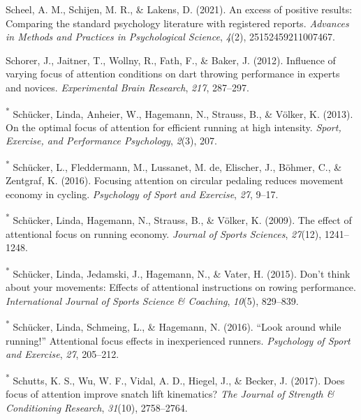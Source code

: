 \documentclass[
  man, donotrepeattitle,floatsintext]{apa7}
\newlength{\cslhangindent}
\newlength{\cslentryspacingunit} %
\newenvironment{CSLReferences}[2] %
 {%
  \setlength{\parindent}{0pt}
  \ifodd #1
  \let\oldpar\par
  \def\par{\hangindent=\cslhangindent\oldpar}
  \fi
  \setlength{\parskip}{#2\cslentryspacingunit}
 }%
 {}
\begin{document}
\begin{CSLReferences}{1}{0}
\leavevmode{}%
Scheel, A. M., Schijen, M. R., \& Lakens, D. (2021). An excess of positive results: Comparing the standard psychology literature with registered reports. \emph{Advances in Methods and Practices in Psychological Science}, \emph{4}(2), 25152459211007467.

\leavevmode{}%
Schorer, J., Jaitner, T., Wollny, R., Fath, F., \& Baker, J. (2012). Influence of varying focus of attention conditions on dart throwing performance in experts and novices. \emph{Experimental Brain Research}, \emph{217}, 287--297.

\leavevmode{}%
\textsuperscript{*} Schücker, Linda, Anheier, W., Hagemann, N., Strauss, B., \& Völker, K. (2013). On the optimal focus of attention for efficient running at high intensity. \emph{Sport, Exercise, and Performance Psychology}, \emph{2}(3), 207.

\leavevmode{}%
\textsuperscript{*} Schücker, L., Fleddermann, M., Lussanet, M. de, Elischer, J., Böhmer, C., \& Zentgraf, K. (2016). Focusing attention on circular pedaling reduces movement economy in cycling. \emph{Psychology of Sport and Exercise}, \emph{27}, 9--17.

\leavevmode{}%
\textsuperscript{*} Schücker, Linda, Hagemann, N., Strauss, B., \& Völker, K. (2009). The effect of attentional focus on running economy. \emph{Journal of Sports Sciences}, \emph{27}(12), 1241--1248.

\leavevmode{}%
\textsuperscript{*} Schücker, Linda, Jedamski, J., Hagemann, N., \& Vater, H. (2015). Don't think about your movements: Effects of attentional instructions on rowing performance. \emph{International Journal of Sports Science \& Coaching}, \emph{10}(5), 829--839.

\leavevmode{}%
\textsuperscript{*} Schücker, Linda, Schmeing, L., \& Hagemann, N. (2016). {``Look around while running!''} Attentional focus effects in inexperienced runners. \emph{Psychology of Sport and Exercise}, \emph{27}, 205--212.

\leavevmode{}%
\textsuperscript{*} Schutts, K. S., Wu, W. F., Vidal, A. D., Hiegel, J., \& Becker, J. (2017). Does focus of attention improve snatch lift kinematics? \emph{The Journal of Strength \& Conditioning Research}, \emph{31}(10), 2758--2764.


\end{CSLReferences}
\end{document}

